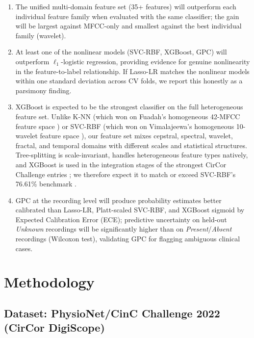 \documentclass[10pt,twocolumn]{article}
\begin{document}
\begin{enumerate}[label=\textbf{H\arabic*:}]
    \item The unified multi-domain feature set (35+ features) will outperform each individual feature family when evaluated with the same classifier; the gain will be largest against MFCC-only and smallest against the best individual family (wavelet).
    \item At least one of the nonlinear models (SVC-RBF, XGBoost, GPC) will outperform $\ell_1$-logistic regression, providing evidence for genuine nonlinearity in the feature-to-label relationship. If Lasso-LR matches the nonlinear models within one standard deviation across CV folds, we report this honestly as a parsimony finding.
    \item XGBoost is expected to be the strongest classifier on the full heterogeneous feature set. Unlike K-NN (which won on Fuadah's homogeneous 42-MFCC feature space \citep{fuadah2023}) or SVC-RBF (which won on Vimalajeewa's homogeneous 10-wavelet feature space \citep{wavelet2025}), our feature set mixes cepstral, spectral, wavelet, fractal, and temporal domains with different scales and statistical structures. Tree-splitting is scale-invariant, handles heterogeneous feature types natively, and XGBoost is used in the integration stages of the strongest CirCor Challenge entries \citep{rohr2024heart2beat, walker2022dbres}; we therefore expect it to match or exceed SVC-RBF's 76.61\% benchmark \citep{wavelet2025}.
    \item GPC at the recording level will produce probability estimates better calibrated than Lasso-LR, Platt-scaled SVC-RBF, and XGBoost sigmoid by Expected Calibration Error (ECE); predictive uncertainty on held-out \textit{Unknown} recordings will be significantly higher than on \textit{Present}/\textit{Absent} recordings (Wilcoxon test), validating GPC for flagging ambiguous clinical cases.
\end{enumerate}

\section{Methodology}

\subsection{Dataset: PhysioNet/CinC Challenge 2022 (CirCor DigiScope)}
\end{document}
